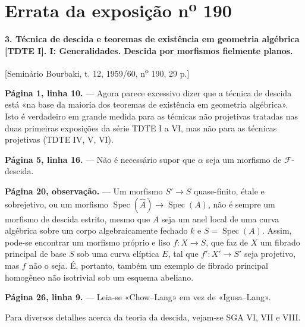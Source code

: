 \clearpage
\chapter*{Errata da exposição n\textsuperscript{o} 190}
\setcounter{footnote}{0}

\noindent\textbf{3. Técnica de descida e teoremas de existência em geometria
algébrica [TDTE I]. I: Generalidades. Descida por morfismos fielmente planos.}

\begin{center}
[Seminário Bourbaki, t. 12, 1959/60, n\textsuperscript{o} 190, 29 p.]
\end{center}

\noindent\textbf{Página 1, linha 10.} --- Agora parece excessivo dizer que a
técnica de descida está «na base da maioria dos teoremas de
existência em geometria algébrica». Isto é verdadeiro em grande medida para as
técnicas não projetivas tratadas nas duas primeiras exposições
da série TDTE I a VI, mas não para as técnicas projetivas (TDTE IV, V,
VI).

\noindent\textbf{Página 5, linha 16.} --- Não é necessário supor que $\alpha$
seja um morfismo de $\mathcal F$-descida.

\noindent\textbf{Página 20, observação.} --- Um morfismo
$S'\longrightarrow S$ quase-finito, étale e sobrejetivo, ou um morfismo
$\operatorname{Spec}(\widehat A)\longrightarrow\operatorname{Spec}(A)$, não é
sempre um morfismo de descida estrito, mesmo que $A$ seja um anel local de uma
curva algébrica sobre um corpo algebraicamente fechado $k$ e
$S=\operatorname{Spec}(A)$. Assim, pode-se encontrar um morfismo próprio e liso
$f:X\longrightarrow S$, que faz de $X$ um fibrado principal de base $S$ sob
uma curva elíptica $E$, tal que $f':X'\longrightarrow S'$ seja projetivo, mas
$f$ não o seja. É, portanto, também um exemplo de fibrado
principal homogêneo não isotrivial sob um esquema abeliano.

\noindent\textbf{Página 26, linha 9.} --- Leia-se «Chow--Lang» em vez de
«Igusa--Lang».

Para diversos detalhes acerca da teoria da descida, vejam-se SGA VI, VII e
VIII.

\par
